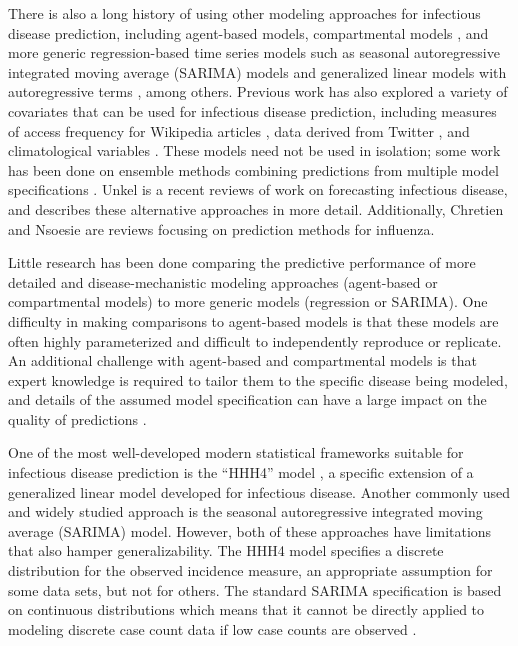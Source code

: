 \documentclass[times, doublespace]{simauth}\usepackage[]{graphicx}\usepackage[]{color}
\begin{document}
There is also a long history of using other modeling approaches for infectious
disease prediction, including agent-based models, compartmental models
\cite{shaman2015improvedInfluenzaEnsembleConsecutivePredictions, yang2014comparisonFilteringInfluenza},
and more generic regression-based time series models such as seasonal autoregressive
integrated moving average (SARIMA) models \cite{martinez2011sarima, martinez2011predicting, luz2008timeSARIMABrazilDengue} and generalized linear models with autoregressive terms \cite{wang2015dynamicARInfluenza, Held2005HHHIntro}, among others.  Previous work has also explored a variety of covariates that can be used for infectious disease prediction,
including measures of access frequency for Wikipedia articles \cite{hickmann2015forecastingInfluenzaWikipedia},
data derived from Twitter \cite{paul2014twitterInfluenzaForecasting, santillana2015combiningSearchTwitterInfluenza},
and climatological variables \cite{lowe2014dengueBrazilClimate}.  These models need not be used in isolation;
some work has been done on ensemble methods combining predictions from multiple model specifications
\cite{shaman2015improvedInfluenzaEnsembleConsecutivePredictions, chakraborty2014forecastingILIEnsemble}.
Unkel \etal \cite{unkel2012statisticalInfectiousDiseasePredictionReview} is a
recent reviews of work on forecasting infectious disease, and describes these alternative
approaches in more detail.  Additionally, Chretien \etal \cite{chretien2014influenza} and
Nsoesie \etal \cite{nsoesie2014systematic} are reviews focusing on prediction methods for influenza.

Little research has been done comparing the predictive performance of more detailed and
disease-mechanistic modeling approaches (agent-based or compartmental
models) to more generic models (regression or SARIMA).  One difficulty in making
comparisons to agent-based models is that these models are often
highly parameterized and difficult to independently reproduce or replicate.
An additional challenge with agent-based and compartmental models is that
expert knowledge is required to tailor them to the specific disease being
modeled, and details of the assumed model specification can
have a large impact on the quality of predictions
\cite{grad2012cholera}.

One of the most well-developed modern statistical frameworks suitable for infectious
disease prediction is the ``HHH4'' model
\cite{Held2005HHHIntro, held2006twoComponentInfectiousDisease, Paul2008MultivariateHHH4, Held2012HHHSeasonality, meyeretal2016SpatioTemporalAnalysisSurveillance},
a specific extension of a generalized linear model developed for infectious
disease.  Another commonly used and widely studied approach is the seasonal
autoregressive integrated moving average (SARIMA) model. However, both of these approaches
have limitations that also hamper generalizability. The HHH4 model specifies a
discrete distribution for the observed incidence measure, an appropriate
assumption for some data sets, but not for others. The standard SARIMA
specification is based on continuous distributions which means that it cannot be
directly applied to modeling discrete case count data if low case counts are
observed \cite{unkel2012statisticalInfectiousDiseasePredictionReview}.
\end{document}
